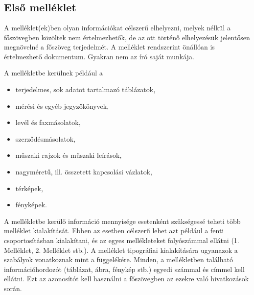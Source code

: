 \appendix
\chapter*{\melleklet}
\setcounter{chapter}{13} %
\setcounter{section}{0}

\section{Első melléklet}

A melléklet(ek)ben olyan információkat célszerű elhelyezni, melyek nélkül a főszövegben közöltek nem értelmezhetők, de az ott történő elhelyezésük jelentősen megnövelné a főszöveg terjedelmét. A melléklet rendszerint önállóan is értelmezhető dokumentum. Gyakran nem az író saját munkája. 

A mellékletbe kerülnek például a
\begin{itemize}
  \item terjedelmes, sok adatot tartalmazó táblázatok,
  \item mérési és egyéb jegyzőkönyvek,
  \item levél és faxmásolatok,
  \item szerződésmásolatok,
  \item műszaki rajzok és műszaki leírások,
  \item nagyméretű, ill. összetett kapcsolási vázlatok,
  \item térképek,
  \item fényképek. 
\end{itemize}

A mellékletbe kerülő információ mennyisége esetenként szükségessé teheti több 
melléklet kialakítását. Ebben az esetben célszerű lehet azt például a fenti 
csoportosításban kialakítani, és az egyes mellékleteket folyószámmal ellátni 
(1. Melléklet, 2. Melléklet stb.).
A melléklet tipográfiai kialakítására ugyanazok a szabályok vonatkoznak mint a 
függelékére. 
Minden, a mellékletben található információhordozót (táblázat, ábra, 
fénykép stb.) egyedi számmal és címmel kell ellátni. Ezt az azonosítót kell 
használni a főszövegben az ezekre való hivatkozások során.


